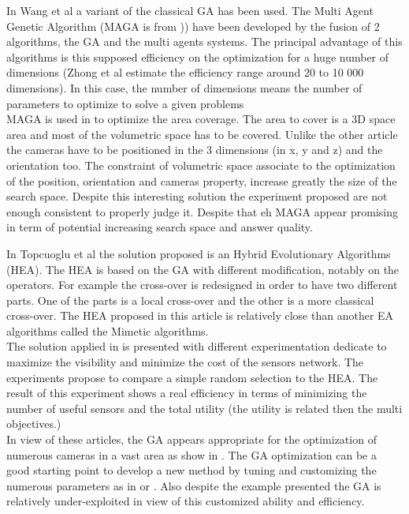 In Wang et al \cite{152*wang2009} a variant of the classical GA has been used. The Multi Agent Genetic Algorithm (MAGA is from \cite{223*zhong2004})) have been developed by the fusion of 2 algorithms, the GA and the multi agents systems. The principal advantage of this algorithms is this supposed efficiency on the optimization for a huge number of dimensions (Zhong et al estimate the efficiency range around 20 to 10 000 dimensions). In this case, the number of dimensions means the number of parameters to optimize to solve a given problems\\
MAGA is used in \cite{152*wang2009} to optimize the area coverage. The area to cover is a 3D space area and most of the volumetric space has to be covered.  Unlike the other article the cameras have to be positioned in the 3 dimensions (in x, y and z) and the orientation too. The constraint of volumetric space associate to the optimization of the position, orientation and cameras property, increase greatly the size of the search space.  
Despite this interesting solution the experiment proposed are not enough consistent to properly judge it. Despite that  eh MAGA appear promising  in term of  potential increasing search space and answer quality. 

In Topcuoglu et al\cite{101*topcuoglu2009} the solution proposed is an Hybrid Evolutionary Algorithms (HEA).  The HEA is based on the GA with different modification, notably on the operators. For example the cross-over is redesigned in order to have two different parts. 
One of the parts is a local cross-over and the other is a more classical cross-over.  
The HEA proposed in this article is relatively close than another EA algorithms called the Mimetic algorithms. \\
The solution applied in \cite{101*topcuoglu2009} is  presented with different experimentation dedicate  to maximize the visibility and minimize the cost of the sensors network. The experiments propose to compare a simple random selection to the HEA. The result of this experiment shows a real efficiency in terms of minimizing the number of useful sensors and the total utility (the utility is related then the multi objectives.) \\

In view of these articles, the GA appears appropriate for the optimization of numerous cameras in  a vast area as show in \cite{165*jiang2010}. The GA optimization can be a good starting point to develop a new method by tuning and customizing the numerous parameters as in \cite{101*topcuoglu2009,152*wang2009}  or \cite{83*van2009}. Also despite the example presented  the GA is relatively under-exploited in view of this customized ability and efficiency.


